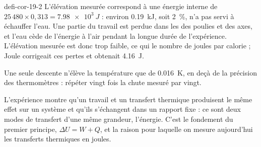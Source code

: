 \begin{blocEdition}{defi-cor-19-2}
\label{figedition-defi-cor-19-2-1}
L'élévation mesurée correspond à une énergie interne de $25\,480\times0{,}313=\qty{7,98e3}{J}$ : environ \qty{0,19}{kJ}, soit
2~\%, n'a pas servi à échauffer l'eau. Une partie du travail est perdue dans les  des poulies et des
axes, et l'eau cède de l'énergie à l'air pendant la longue durée de l'expérience. L'élévation mesurée est donc trop
faible, ce qui  le nombre de joules par calorie ; Joule corrigeait ces pertes et obtenait
\qty{4,16}{J}.

Une seule descente n'élève la température que de \qty{0,016}{K}, en deçà de la précision des thermomètres : répéter vingt
fois la chute  mesuré par vingt.

L'expérience montre qu'un travail et un transfert thermique produisent le même effet sur un système et qu'ils
s'échangent dans un rapport fixe : ce sont deux modes de transfert d'une même grandeur, l'énergie. C'est le fondement
du premier principe, $\Delta U=W+Q$, et la raison pour laquelle on mesure aujourd'hui les transferts thermiques en
joules.
\end{blocEdition}

